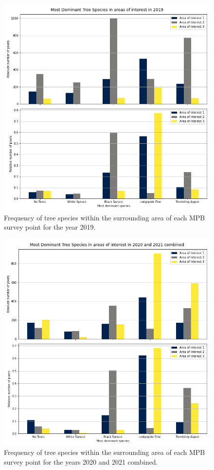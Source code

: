 \documentclass[
]{article}
\begin{document}
\begin{figure}

{\centering \includegraphics[width=0.8\linewidth]{../graphics/freq_species_19} 

}

\caption{Frequency of tree species within the surrounding area of each MPB survey point for the year 2019.}\label{fig:freqSpecies19}
\end{figure}
\begin{figure}

{\centering \includegraphics[width=0.8\linewidth]{../graphics/freq_species_20_21} 

}

\caption{Frequency of tree species within the surrounding area of each MPB survey point for the years 2020 and 2021 combined.}\label{fig:freqSpecies20-21}
\end{figure}
\end{document}
